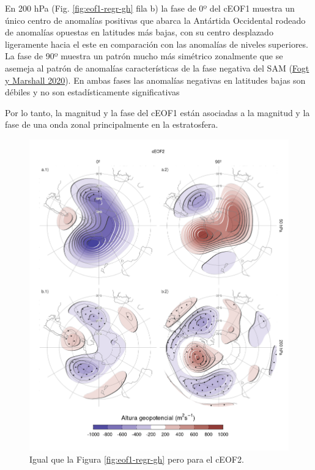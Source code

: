 \documentclass[12pt,oneside,a4paper]{reedthesis}
\begin{document}
En 200 hPa (Fig. \ref{fig:eof1-regr-gh} fila b) la fase de 0º del cEOF1 muestra un único centro de anomalías positivas que abarca la Antártida Occidental rodeado de anomalías opuestas en latitudes más bajas, con su centro desplazado ligeramente hacia el este en comparación con las anomalías de niveles superiores.
La fase de 90º muestra un patrón mucho más simétrico zonalmente que se asemeja al patrón de anomalías características de la fase negativa del SAM (\protect\hyperlink{ref-fogt2020}{Fogt y Marshall 2020}).
En ambas fases las anomalías negativas en latitudes bajas son débiles y no son estadísticamente significativas

Por lo tanto, la magnitud y la fase del cEOF1 están asociadas a la magnitud y la fase de una onda zonal principalmente en la estratosfera.



\begin{figure}

{\centering \includegraphics{figures/20-ceofs/eof2-regr-gh-1} 

}

\caption{Igual que la Figura \ref{fig:eof1-regr-gh} pero para el cEOF2.}\label{fig:eof2-regr-gh}
\end{figure}
\end{document}
